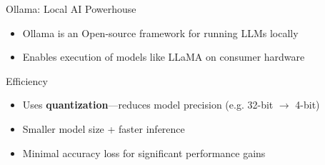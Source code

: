 \documentclass[aspectratio=169]{beamer}
\begin{document}
\begin{frame}{Ollama: Local AI Powerhouse}
\begin{itemize}
    \item Ollama is an Open-source framework for running LLMs locally
    \item Enables execution of models like LLaMA on consumer hardware
\end{itemize}

\begin{block}{Efficiency}
\begin{itemize}
    \item Uses \textbf{quantization}—reduces model precision (e.g. 32-bit $\rightarrow$ 4-bit)
    \item Smaller model size + faster inference
    \item Minimal accuracy loss for significant performance gains
\end{itemize}
\end{block}


\end{frame}
\end{document}
